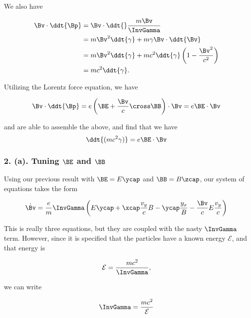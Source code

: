 We also have

\begin{align*}
\Bv \cdot \ddt{\Bp} 
&= \Bv \cdot \ddt{} \frac{m \Bv}{\InvGamma} \\
&= m\Bv^2 \ddt{\gamma} + m \gamma \Bv \cdot \ddt{\Bv} \\
&= m\Bv^2 \ddt{\gamma} + m c^2 \ddt{\gamma} \left( 1 - \frac{\Bv^2}{c^2} \right) \\
&= m c^2 \ddt{\gamma}.
\end{align*}

Utilizing the Lorentz force equation, we have

\begin{equation}\label{eqn:relElectroDynProblemSet2:250}
\Bv \cdot \ddt{\Bp} = e \left( \BE + \frac{\Bv}{c} \cross \BB \right) \cdot \Bv = e \BE \cdot \Bv
\end{equation}

and are able to assemble the above, and find that we have
\begin{equation}\label{eqn:relElectroDynProblemSet2:270}
\ddt{(m c^2 \gamma)} = e \BE \cdot \Bv 
\end{equation}

\subsubsection{2. (a). Tuning $\BE$ and $\BB$}

Using our previous result with $\BE = E \ycap$ and $\BB = B \zcap$, our system of equations takes the form

\begin{equation}\label{eqn:relElectroDynProblemSet2:290}
\dot{\Bv} = \frac{e}{m} \InvGamma \left( E \ycap + \xcap \frac{v_y}{c} B - \ycap \frac{y_x} B - \frac{\Bv}{c} E \frac{v_y}{c} \right)
\end{equation}

This is really three equations, but they are coupled with the nasty $\InvGamma$ term.  However, since it is specified that the particles have a known energy $\mathcal{E}$, and that energy is

\begin{equation}\label{eqn:relElectroDynProblemSet2:310}
\mathcal{E} = \frac{ m c^2 }{\InvGamma},
\end{equation}

we can write

\begin{equation}\label{eqn:relElectroDynProblemSet2:330}
\InvGamma = \frac{ m c^2 }{\mathcal{E}}
\end{equation}

